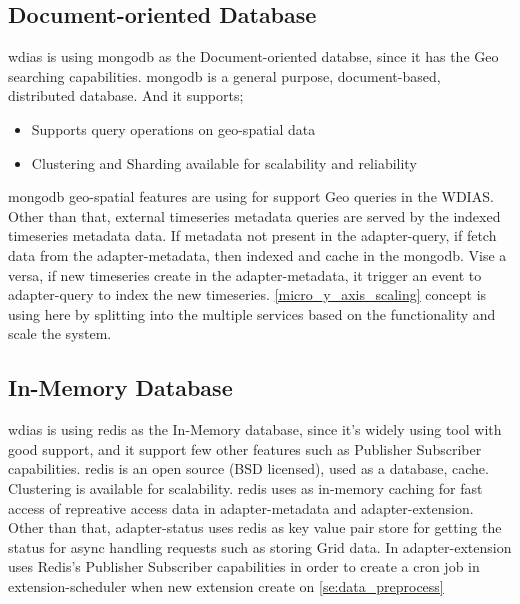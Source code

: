 \subsection{Document-oriented Database}
\label{sub:mongodb}

\acrshort{wdias} is using \acrshort{mongodb} as the Document-oriented databse, since it has the Geo searching capabilities.
\acrshort{mongodb} \cite{mongodbMongoDBManual} is a general purpose, document-based, distributed database. And it supports;
\begin{itemize}
  \item Supports query operations on geo-spatial data \cite{mongodbMongoDBManual}
  \item Clustering and Sharding available for scalability and reliability
\end{itemize}
\acrshort{mongodb} geo-spatial features are using for support Geo queries in the WDIAS. Other than that, external timeseries metadata queries are served by the indexed timeseries metadata data.
If metadata not present in the adapter-query, if fetch data from the adapter-metadata, then indexed and cache in the \acrshort{mongodb}. Vise a versa, if new timeseries create in the adapter-metadata, it trigger an event to adapter-query to index the new timeseries.
\ref{micro_y_axis_scaling} concept is using here by splitting into the multiple services based on the functionality and scale the system.

\subsection{In-Memory Database}
\label{sub:redis}
\acrshort{wdias} is using \acrshort{redis} \cite{redisRedisDocumentation} as the In-Memory database, since it's widely using tool with good support, and it support few other features such as Publisher Subscriber capabilities.
\acrshort{redis} is an open source (BSD licensed), used as a database, cache. Clustering is available for scalability.
\acrshort{redis} uses as in-memory caching for fast access of repreative access data in adapter-metadata and adapter-extension.
Other than that, adapter-status uses \acrshort{redis} as key value pair store for getting the status for async handling requests such as storing Grid data.
In adapter-extension uses Redis's Publisher Subscriber capabilities in order to create a cron job in extension-scheduler when new extension create on \ref{se:data_preprocess}
